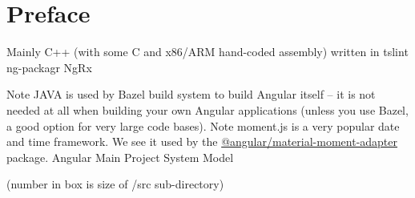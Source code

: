 \chapter{Preface}

Mainly C++ (with some C and x86/ARM hand-coded assembly)
written in
tslint
ng-packagr
NgRx

Note JAVA is used by Bazel build system to build Angular itself – it is not needed at all
when building your own Angular applications (unless you use Bazel, a good option for
very large code bases). Note moment.js is a very popular date and time framework.
We see it used by the
\url{@angular/material-moment-adapter}
package.
Angular Main Project System Model

(number in box is size of /src sub-directory)







